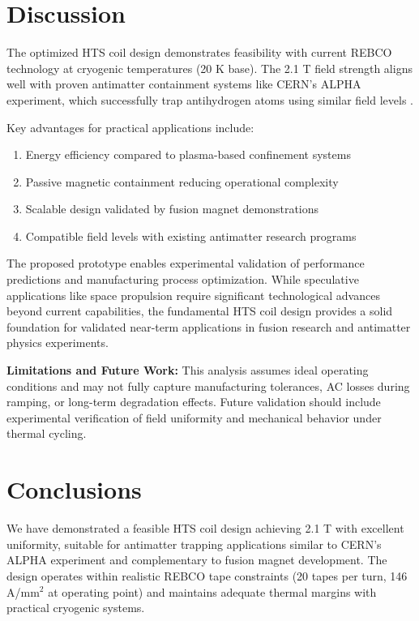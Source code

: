 \documentclass[12pt,a4paper]{article}
\begin{document}
\section{Discussion}

The optimized HTS coil design demonstrates feasibility with current REBCO technology at cryogenic temperatures (20 K base). The 2.1 T field strength aligns well with proven antimatter containment systems like CERN's ALPHA experiment, which successfully trap antihydrogen atoms using similar field levels \cite{alpha2023}.

Key advantages for practical applications include:
\begin{enumerate}
\item Energy efficiency compared to plasma-based confinement systems
\item Passive magnetic containment reducing operational complexity
\item Scalable design validated by fusion magnet demonstrations \cite{sparc2020}
\item Compatible field levels with existing antimatter research programs \cite{aegis2018}
\end{enumerate}

The proposed prototype enables experimental validation of performance predictions and manufacturing process optimization. While speculative applications like space propulsion require significant technological advances beyond current capabilities, the fundamental HTS coil design provides a solid foundation for validated near-term applications in fusion research and antimatter physics experiments.

\textbf{Limitations and Future Work:} This analysis assumes ideal operating conditions and may not fully capture manufacturing tolerances, AC losses during ramping, or long-term degradation effects. Future validation should include experimental verification of field uniformity and mechanical behavior under thermal cycling.

\section{Conclusions}

We have demonstrated a feasible HTS coil design achieving 2.1 T with excellent uniformity, suitable for antimatter trapping applications similar to CERN's ALPHA experiment and complementary to fusion magnet development. The design operates within realistic REBCO tape constraints (20 tapes per turn, 146 A/mm$^2$ at operating point) and maintains adequate thermal margins with practical cryogenic systems.
\end{document}
